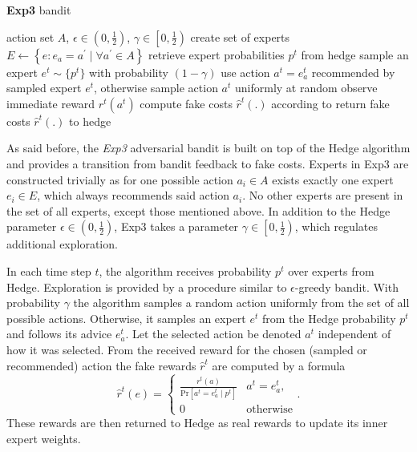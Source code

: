 \documentclass[../main.tex]{subfiles}
\begin{document}
\begin{algorithm}
    \caption{\textbf{Exp3} bandit}
    \label{bandit:adversarial:exp3:alg}
    \begin{algorithmic}[1]
        \Require action set $A$, $\epsilon \in \left(0, \frac{1}{2}\right)$, $\gamma \in \left[0, \frac{1}{2}\right)$
        \State create set of experts $E \leftarrow \left\{e: e_a = a^{\prime} \mid \forall a^{\prime} \in A\right\}$
            \State retrieve expert probabilities $p^t$ from hedge
            \State sample an expert $e^t \sim \{p^t\}$
            \State with probability $(1 - \gamma)$ use action $a^t = e^t_a$ recommended by sampled expert $e^t$, otherwise sample action $a^t$ uniformly at random
            \State observe immediate reward $r^t(a^t)$
            \State compute fake costs $\hat{r}^t(.)$ according to 
            \State return fake costs $\hat{r}^t(.)$ to hedge
        \EndFor
    \end{algorithmic}
\end{algorithm}

As said before, the \textit{Exp3} adversarial bandit is built on top of the Hedge algorithm  and provides a transition from bandit feedback to fake costs.
Experts in Exp3 are constructed trivially as for one possible action $a_i \in A$ exists exactly one expert $e_i \in E$, which always recommends said action $a_i$.
No other experts are present in the set of all experts, except those mentioned above.
In addition to the Hedge parameter $\epsilon \in \left(0, \frac{1}{2}\right)$, Exp3 takes a parameter $\gamma \in \left[0, \frac{1}{2}\right)$, which regulates additional exploration.

In each time step $t$, the algorithm receives probability $p^t$ over experts from Hedge.
Exploration is provided by a procedure similar to $\epsilon$-greedy bandit.
With probability $\gamma$ the algorithm samples a random action uniformly from the set of all possible actions.
Otherwise, it samples an expert $e^t$ from the Hedge probability $p^t$ and follows its advice $e^t_a$.
Let the selected action be denoted $a^t$ independent of how it was selected.
From the received reward for the chosen (sampled or recommended) action the fake rewards $\hat{r}^t$ are computed by a formula
\begin{equation}\label{bandit:adversarial:exp3:fakecosts}
    \hat{r}^t(e) = \begin{cases} \frac{r^t(a)}{\text{Pr}\left[a^t = e^t_a \mid p^t\right]} & a^t = e^t_a, \\ 0 & \text{otherwise}\end{cases}.
\end{equation}
These rewards are then returned to Hedge as real rewards to update its inner expert weights.
\end{document}
